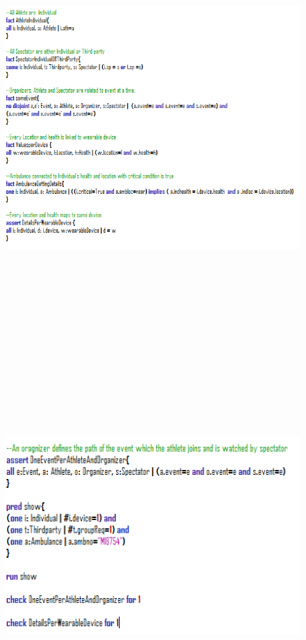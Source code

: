 \begin{figure}[H]	\includegraphics[width=16cm,height=18cm]{./Alloy/fact2+assert1.PNG}
\end{figure}
\begin{figure}[H]	\includegraphics[width=16cm,height=12cm]{./Alloy/assert2+pred.PNG}
\end{figure}
